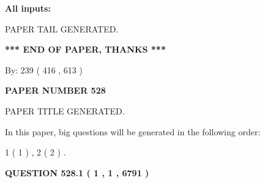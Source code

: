 \documentclass{ctexart}
\begin{document}
   
   
   
\noindent{}
   
   
   
   
\noindent\vspace{0.1in}\hspace{-0.08in} {\textbf{\Large{All inputs: }}}
   
   
   
   
   
   
 \vspace{0.2in}
 
   
   
\vspace{2.0in} PAPER TAIL GENERATED.
   
   
   
   
\vspace{1.0in} 
{\textbf{\large{ *** END OF PAPER, THANKS *** }}} 
   
   
\hspace{1.0in} By: 
 239 ( 416 ,  613 )
   
   
   
   
\newpage 
\setcounter{page}{ 
   528001 } 
   
   
   
   
 {\textbf{ \Large{ PAPER NUMBER  528  }}}
   
   
\vspace{0.2in}
   
   
   
   
   
   
   
   
 \vspace{0.2in}
 
 
 
 
   
   
 PAPER TITLE GENERATED.
   
   
   
\vspace{0.2in}
   
In this paper, big questions will be generated in the following order: 
   
   
   1 ( 1 )
 ,
   2 ( 2 )
 .
  
\vspace{0.2in}
  
{\textbf{\Large{QUESTION
528.1 
 ( 1 , 1 , 6791 )
}}}
  
\end{document}
